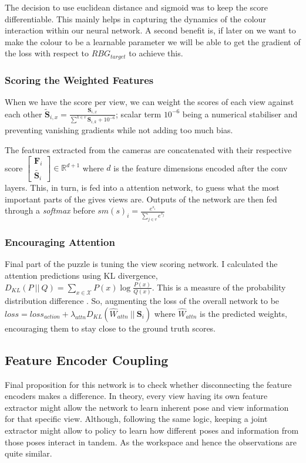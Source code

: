 The decision to use euclidean distance and sigmoid was to keep the score differentiable. This mainly helps in capturing the dynamics of the colour interaction within our neural network. A second benefit is, if later on we want to make the colour to be a learnable parameter we will be able to get the gradient of the loss with respect to ${RBG}_{target}$ to achieve this.

\subsubsection{Scoring the Weighted Features}
When we have the score per view, we can weight the scores of each view against each other
\( \tilde{\mathbf{S}}_{i, x} = \frac{\mathbf{S}_{i, x}}{\sum_{}^{k \in v} \mathbf{S}_{i, k} + 10^{-6}} \); scalar term $10^{-6}$ being a numerical stabiliser and preventing vanishing gradients while not adding too much bias.

The features extracted from the cameras are concatenated with their respective score \( \begin{bmatrix} \mathbf{F}_i \\ \tilde{\mathbf{S}_i} \end{bmatrix} \in \mathbb{R}^{d + 1}\) where $d$ is the feature dimensions encoded after the conv layers. This, in turn, is fed into a attention network, to guess what the most important parts of the gives views are. Outputs of the network are then fed through a \emph{softmax} before \(sm\left(s\right)_i = \frac{e^{s_i}}{\sum_{j \in v}{e^{s_j}}}\)

\subsubsection{Encouraging Attention}
Final part of the puzzle is tuning the view scoring network. I calculated the attention predictions using KL divergence, \(D_{KL}\left(P ~||~ Q\right) = \sum_{x \in \mathcal{X}} P\left(x\right) \log \frac{P\left(x\right)}{Q\left(x\right)}\). This is a measure of the probability distribution difference . So, augmenting the loss of the overall network to be \(loss = loss_{action} + \lambda_{attn} D_{KL}\left( \hat{W}_{attn} ~||~ \mathbf{S}_i\right)\) where $\hat{W}_{attn}$ is the predicted weights, encouraging them to stay close to the ground truth scores.

\subsection{Feature Encoder Coupling}
Final proposition for this network is to check whether disconnecting the feature encoders makes a difference. In theory, every view having its own feature extractor might allow the network to learn inherent pose and view information for that specific view. Although, following the same logic, keeping a joint extractor might allow to policy to learn how different poses and information from those poses interact in tandem. As the workspace and hence the observations are quite similar.
